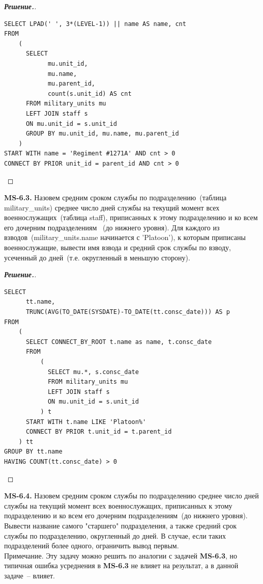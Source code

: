 \documentclass[a4paper]{article}
\newcommand{\MYlvm}{\leavevmode\vspace{-0.3cm}}		%
\begin{document}
\begin{proof}[{\bf Решение.}]\MYlvm\\
\begin{lstlisting}
SELECT LPAD(' ', 3*(LEVEL-1)) || name AS name, cnt
FROM 
    ( 
      SELECT 
            mu.unit_id, 
            mu.name, 
            mu.parent_id, 
            count(s.unit_id) AS cnt
      FROM military_units mu 
      LEFT JOIN staff s
      ON mu.unit_id = s.unit_id 
      GROUP BY mu.unit_id, mu.name, mu.parent_id
    )
START WITH name = 'Regiment #1271A' AND cnt > 0
CONNECT BY PRIOR unit_id = parent_id AND cnt > 0
\end{lstlisting}
\end{proof}


\noindent
{\bf MS-6.3.}
Назовем средним сроком службы по подразделению~(таблица military\_units) среднее 
число дней службы на текущий момент всех военнослужащих~(таблица staff), 
приписанных к этому подразделению и ко всем его дочерним подразделениям~ 
(до нижнего уровня). Для каждого из взводов~(military\_units.name начинается с 
'Platoon'), к которым приписаны военнослужащие, вывести имя взвода и средний 
срок службы по взводу, усеченный до дней~(т.е. округленный в меньшую сторону).

\begin{proof}[{\bf Решение.}]\MYlvm\\
\begin{lstlisting}
SELECT 
      tt.name, 
      TRUNC(AVG(TO_DATE(SYSDATE)-TO_DATE(tt.consc_date))) AS p
FROM
    ( 
      SELECT CONNECT_BY_ROOT t.name as name, t.consc_date
      FROM
          ( 
            SELECT mu.*, s.consc_date
            FROM military_units mu 
            LEFT JOIN staff s 
            ON mu.unit_id = s.unit_id 
          ) t
      START WITH t.name LIKE 'Platoon%'
      CONNECT BY PRIOR t.unit_id = t.parent_id 
    ) tt
GROUP BY tt.name
HAVING COUNT(tt.consc_date) > 0
\end{lstlisting}
\end{proof}


\noindent
{\bf MS-6.4.}
Назовем средним сроком службы по подразделению среднее число дней службы на 
текущий момент всех военнослужащих, приписанных к этому подразделению и ко всем 
его дочерним подразделениям~(до нижнего уровня).
Вывести название самого "старшего" подразделения, а также средний срок службы по
подразделению, округленный до дней. В случае, если таких подразделений более 
одного, ограничить вывод первым. \\
Примечание. Эту задачу можно решить по аналогии с задачей {\bf MS-6.3}, но типичная 
ошибка усреднения в {\bf MS-6.3} не влияет на результат, а в данной задаче~-- влияет.
\end{document}
